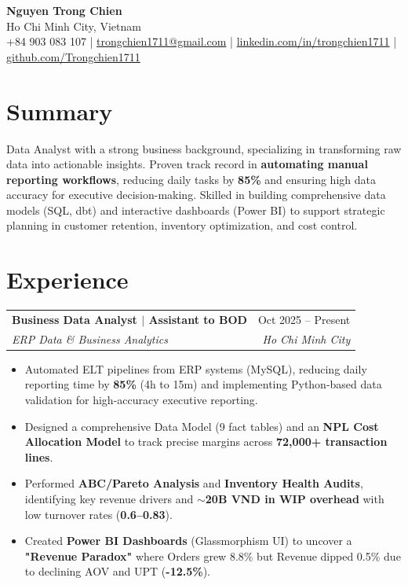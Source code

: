 \documentclass[letterpaper,11pt]{article}
\makeatletter
\newcommand{\resumeItem}[1]{
  \item #1
}
\newcommand{\resumeSubheading}[4]{
  \vspace{2pt}
  \begin{tabular*}{\textwidth}{l@{\extracolsep{\fill}}r}
    \textbf{#1} & #2 \\
    \textit{#3} & \textit{#4}
  \end{tabular*}
}
\makeatother
\begin{document}
\begin{center}
  {\Huge \textbf{Nguyen Trong Chien}} \\[4pt]
  Ho Chi Minh City, Vietnam \\[2pt]
  +84 903 083 107 \quad | \quad
  \href{mailto:trongchien1711@gmail.com}{trongchien1711@gmail.com} \quad | \quad
  \href{https://linkedin.com/in/trongchien1711}{linkedin.com/in/trongchien1711} \quad | \quad
  \href{https://github.com/Trongchien1711}{github.com/Trongchien1711}
\end{center}

\section{Summary}
Data Analyst with a strong business background, specializing in transforming raw data into actionable insights. Proven track record in \textbf{automating manual reporting workflows}, reducing daily tasks by \textbf{85\%} and ensuring high data accuracy for executive decision-making. Skilled in building comprehensive data models (SQL, dbt) and interactive dashboards (Power BI) to support strategic planning in customer retention, inventory optimization, and cost control.

\section{Experience}

\resumeSubheading
{Business Data Analyst $|$ Assistant to BOD}{Oct 2025 -- Present}
{ERP Data \& Business Analytics}{Ho Chi Minh City}

\begin{itemize}
  \resumeItem{Automated ELT pipelines from ERP systems (MySQL), reducing daily reporting time by \textbf{85\%} (4h to 15m) and implementing Python-based data validation for high-accuracy executive reporting.}
  \resumeItem{Designed a comprehensive Data Model (9 fact tables) and an \textbf{NPL Cost Allocation Model} to track precise margins across \textbf{72,000+ transaction lines}.}
  \resumeItem{Performed \textbf{ABC/Pareto Analysis} and \textbf{Inventory Health Audits}, identifying key revenue drivers and \textbf{$\sim$20B VND in WIP overhead} with low turnover rates (\textbf{0.6--0.83}).}
  \resumeItem{Created \textbf{Power BI Dashboards} (Glassmorphism UI) to uncover a \textbf{"Revenue Paradox"} where Orders grew 8.8\% but Revenue dipped 0.5\% due to declining AOV and UPT (\textbf{-12.5\%}).}
\end{itemize}
\end{document}
